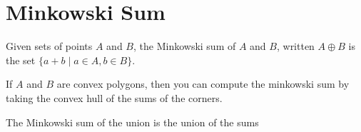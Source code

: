 \chapter{Minkowski Sum}

\begin{definition}
  \label{def:minkowski}
  Given sets of points $A$ and $B$, the Minkowski sum of $A$ and $B$, written
  $A ⊕ B$ is the set $\{a + b \mid a ∈ A, b ∈ B\}$.
\end{definition}

\begin{theorem}
  \label{thm:minkowski_convex_poly}
  \notready
  If $A$ and $B$ are convex polygons, then you can compute the minkowski sum by
  taking the convex hull of the sums of the corners.
\end{theorem}

\begin{theorem}
  \label{thm:minkowski_union}
  \notready
  The Minkowski sum of the union is the union of the sums
\end{theorem}

